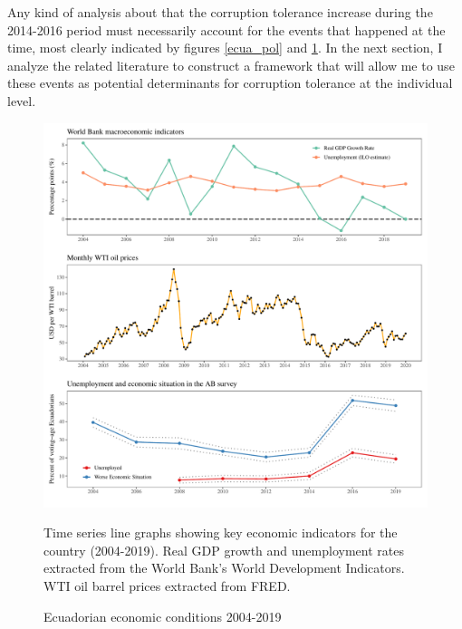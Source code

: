 \documentclass[12pt,a4]{article}
\makeatletter
\def\maxwidth{ %
  \ifdim\Gin@nat@width>\linewidth
    \linewidth
  \else
    \Gin@nat@width
  \fi
}
\newenvironment{knitrout}{}{} %
\makeatother
\begin{document}
Any kind of analysis about that the corruption tolerance increase during the 2014-2016 period must necessarily account for the events that happened at the time, most clearly indicated by figures \ref{ecua_pol} and \ref{fig:ecua_ec}. In the next section, I analyze the related literature to construct a framework that will allow me to use these events as potential determinants for corruption tolerance at the individual level. 


\begin{figure}[htbp!]
\begin{center}
\begin{knitrout}
\color{fgcolor}

{\centering \includegraphics[width=\maxwidth]{figure/econ_graph-1} 

}


\end{knitrout}
\caption{Ecuadorian economic conditions 2004-2019}
\label{fig:ecua_ec}
Time series line graphs showing key economic indicators for the country (2004-2019). Real GDP growth and unemployment rates extracted from the World Bank's World Development Indicators. WTI oil barrel prices extracted from FRED.
\end{center}
\end{figure}
\end{document}
